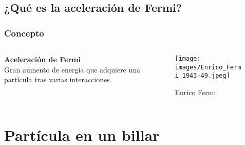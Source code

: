 \documentclass{beamer}
\begin{document}
\subsection{¿Qué es la aceleración de Fermi?}

\begin{frame}
    \frametitle[prueb1]{Concepto}
    \begin{columns}
    \begin{column}{0.5\textwidth}
        \textbf{Aceleración de Fermi}\\
        Gran aumento de energía que adquiere una partícula tras varias interacciones.
    \end{column}
    \begin{column}{0.5\textwidth}
        \begin{figure}
            \texttt{[image: images/Enrico\_Fermi\_1943-49.jpeg]}
            \caption{Enrico Fermi}  
        \end{figure}    
    \end{column}

    \end{columns}
\end{frame}

%



\section{Partícula en un billar}
\end{document}
